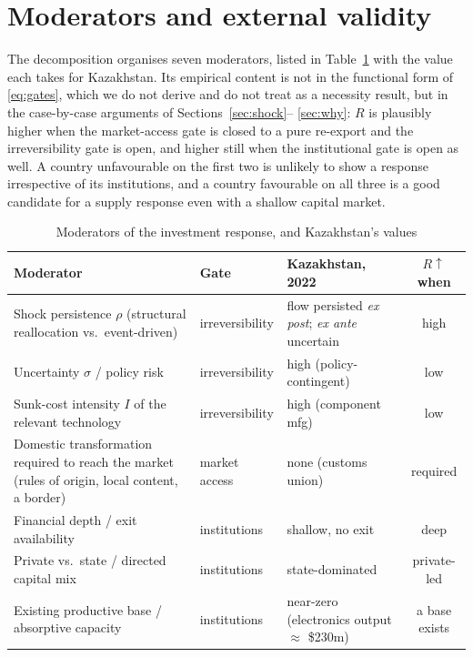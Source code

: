 \documentclass[12pt]{article}
\begin{document}
\section{Moderators and external validity}\label{sec:moderators}

The decomposition organises seven moderators, listed in
Table~\ref{tab:moderators} with the value each takes for Kazakhstan. Its empirical content is
not in the functional form of \eqref{eq:gates}, which we do not derive and do not treat as a
necessity result, but in the case-by-case arguments of Sections~\ref{sec:shock}--%
\ref{sec:why}: $R$ is plausibly higher when the market-access gate is closed to a pure
re-export and the irreversibility gate is open, and higher still when the institutional gate is
open as well. A country unfavourable on the first two is unlikely to show a response
irrespective of its institutions, and a country favourable on all three is a good candidate for
a supply response even with a shallow capital market.

\begin{table}[t]
\centering
\caption{Moderators of the investment response, and Kazakhstan's values}
\label{tab:moderators}
\small
\begin{tabular}{@{}p{5.4cm}p{2.3cm}p{3.1cm}c@{}}
\toprule
Moderator & Gate & Kazakhstan, 2022 & $R\!\uparrow$ when \\
\midrule
Shock persistence $\rho$ (structural reallocation vs.\ event-driven) & irreversibility & flow persisted \emph{ex post}; \emph{ex ante} uncertain & high \\
Uncertainty $\sigma$ / policy risk & irreversibility & high (policy-contingent) & low \\
Sunk-cost intensity $I$ of the relevant technology & irreversibility & high (component mfg) & low \\
Domestic transformation required to reach the market (rules of origin, local content, a border) & market access & none (customs union) & required \\
Financial depth / exit availability & institutions & shallow, no exit & deep \\
Private vs.\ state / directed capital mix & institutions & state-dominated & private-led \\
Existing productive base / absorptive capacity & institutions & near-zero (electronics output $\approx$ \$230m) & a base exists \\
\bottomrule
\end{tabular}
\end{table}
\end{document}
